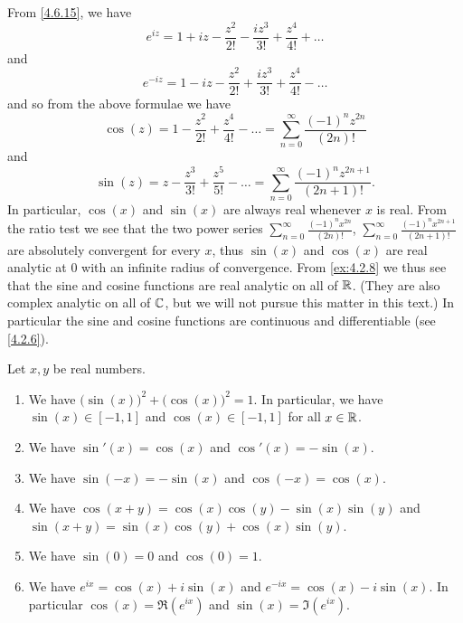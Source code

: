\begin{ac}\label{ac:4.7.1}
  From \cref{4.6.15}, we have
  \[
    e^{i z} = 1 + i z - \frac{z^2}{2!} - \frac{i z^3}{3!} + \frac{z^4}{4!} + \dots
  \]
  and
  \[
    e^{- i z} = 1 - i z - \frac{z^2}{2!} + \frac{i z^3}{3!} + \frac{z^4}{4!} - \dots
  \]
  and so from the above formulae we have
  \[
    \cos(z) = 1 - \frac{z^2}{2!} + \frac{z^4}{4!} - \dots = \sum_{n = 0}^\infty \frac{(-1)^n z^{2n}}{(2n)!}
  \]
  and
  \[
    \sin(z) = z - \frac{z^3}{3!} + \frac{z^5}{5!} - \dots = \sum_{n = 0}^\infty \frac{(-1)^n z^{2n + 1}}{(2n + 1)!}.
  \]
  In particular, \(\cos(x)\) and \(\sin(x)\) are always real whenever \(x\) is real.
  From the ratio test we see that the two power series \(\sum_{n = 0}^\infty \frac{(-1)^n x^{2n}}{(2n)!}\), \(\sum_{n = 0}^\infty \frac{(-1)^n x^{2n + 1}}{(2n + 1)!}\) are absolutely convergent for every \(x\), thus \(\sin(x)\) and \(\cos(x)\) are real analytic at \(0\) with an infinite radius of convergence.
  From \cref{ex:4.2.8} we thus see that the sine and cosine functions are real analytic on all of \(\mathbb{R}\).
  (They are also complex analytic on all of \(\mathbb{C}\), but we will not pursue this matter in this text.)
  In particular the sine and cosine functions are continuous and differentiable (see \cref{4.2.6}).
\end{ac}

\begin{thm}\label{4.7.2}
  Let \(x, y\) be real numbers.
  \begin{enumerate}
    \item We have \(\big(\sin(x)\big)^2 + \big(\cos(x)\big)^2 = 1\).
          In particular, we have \(\sin(x) \in [-1, 1]\) and \(\cos(x) \in [-1, 1]\) for all \(x \in \mathbb{R}\).
    \item We have \(\sin'(x) = \cos(x)\) and \(\cos'(x) = -\sin(x)\).
    \item We have \(\sin(-x) = -\sin(x)\) and \(\cos(-x) = \cos(x)\).
    \item We have \(\cos(x + y) = \cos(x) \cos(y) - \sin(x) \sin(y)\) and \(\sin(x + y) = \sin(x) \cos(y) + \cos(x) \sin(y)\).
    \item We have \(\sin(0) = 0\) and \(\cos(0) = 1\).
    \item We have \(e^{i x} = \cos(x) + i \sin(x)\) and \(e^{- i x} = \cos(x) - i \sin(x)\).
          In particular \(\cos(x) = \Re(e^{i x})\) and \(\sin(x) = \Im(e^{i x})\).
  \end{enumerate}
\end{thm}

